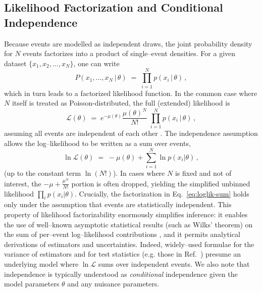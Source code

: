    \subsection{Likelihood Factorization and Conditional Independence}
        Because events are modelled as independent draws, the joint probability density for $N$ events factorizes into a product of single--event densities.
        For a given dataset $\{x_1, x_2, \dots, x_N\}$, one can write 
        \[
             P(x_1,\ldots,x_N \,|\, \theta) \;=\; \prod_{i=1}^{N} p(x_i \,|\, \theta)\,,
        \] 
        which in turn leads to a factorized likelihood function.
        In the common case where $N$ itself is treated as Poisson-distributed, the full (extended) likelihood is 
        \begin{equation}
            \mathcal{L}(\theta) \;=\; e^{-\mu(\theta)} \frac{\mu(\theta)^N}{N!}\;\prod_{i=1}^{N} p(x_i \,|\, \theta)\,,
            \label{eq:extended-likelihood}
        \end{equation}
        assuming all events are independent of each other .
        The independence assumption allows the log--likelihood to be written as a sum over events,
        \begin{equation}
            \ln \mathcal{L}(\theta) \;=\; -\mu(\theta) + \sum_{i=1}^{N} \ln p(x_i|\theta)\,,
            \label{eq:loglik-sum}
        \end{equation}
        (up to the constant term $\ln(N!)$).
        In cases where $N$ is fixed and not of interest, the $-\mu + \frac{\mu^N}{N!}$ portion is often dropped, yielding the simplified unbinned likelihood $\prod_{i}p(x_i|\theta)$.
        Crucially, the factorization in Eq.~\ref{eq:loglik-sum} holds only under the assumption that events are statistically independent.
        This property of likelihood factorizability enormously simplifies inference: it enables the use of well--known asymptotic statistical results (such as Wilks’ theorem) on the sum of per--event log--likelihood contributions , and it permits analytical derivations of estimators and uncertainties.
        Indeed, widely--used formulae for the variance of estimators and for test statistics (e.g. those in Ref.~) presume an underlying model where $\ln\mathcal{L}$ sums over independent events.
        We also note that independence is typically understood as \emph{conditional} independence given the model parameters $\theta$ and any nuisance parameters.
